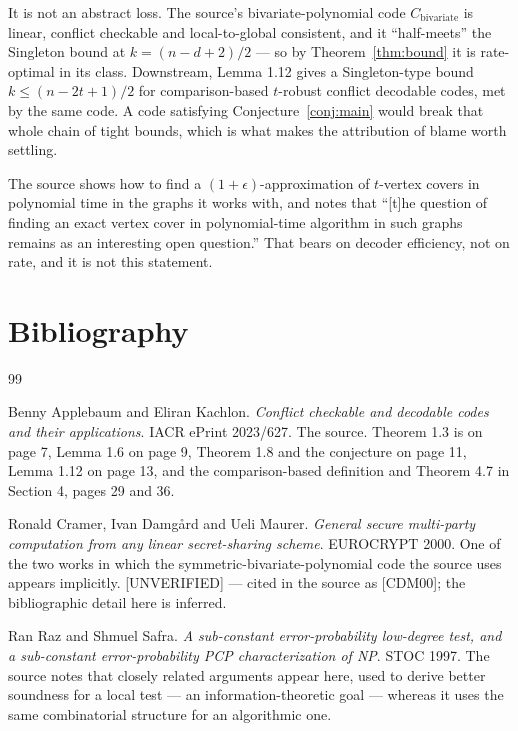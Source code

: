 \documentclass{conjura-conjecture}
\begin{document}
\begin{remark}\label{rem:cost}
It is not an abstract loss. The source's bivariate-polynomial code
$C_{\mathrm{bivariate}}$ is linear, conflict checkable and local-to-global
consistent, and it ``half-meets'' the Singleton bound at $k =
(n-d+2)/2$ --- so by Theorem~\ref{thm:bound} it is rate-optimal in its
class. Downstream, Lemma 1.12 gives a Singleton-type bound $k \le
(n-2t+1)/2$ for comparison-based $t$-robust conflict decodable codes, met
by the same code. A code satisfying Conjecture~\ref{conj:main} would
break that whole chain of tight bounds, which is what makes the
attribution of blame worth settling.
\end{remark}

\begin{remark}\label{rem:neighbours}
The source shows how to find a $(1+\epsilon)$-approximation of
$t$-vertex covers in polynomial time in the graphs it works with, and
notes that ``[t]he question of finding an exact vertex cover in
polynomial-time algorithm in such graphs remains as an interesting open
question.'' That bears on decoder efficiency, not on rate, and it is not
this statement.
\end{remark}

\section{Bibliography}

\begin{conjurabibliography}{99}

Benny Applebaum and Eliran Kachlon.
\emph{Conflict checkable and decodable codes and their applications}.
IACR ePrint 2023/627.
The source. Theorem 1.3 is on page 7, Lemma 1.6 on page 9, Theorem 1.8
and the conjecture on page 11, Lemma 1.12 on page 13, and the
comparison-based definition and Theorem 4.7 in Section 4, pages 29 and
36.

Ronald Cramer, Ivan Damg\r{a}rd and Ueli Maurer.
\emph{General secure multi-party computation from any linear secret-sharing
scheme}.
EUROCRYPT 2000.
One of the two works in which the symmetric-bivariate-polynomial code the
source uses appears implicitly. [UNVERIFIED] --- cited in the source as
[CDM00]; the bibliographic detail here is inferred.

Ran Raz and Shmuel Safra.
\emph{A sub-constant error-probability low-degree test, and a
sub-constant error-probability PCP characterization of NP}.
STOC 1997.
The source notes that closely related arguments appear here, used to
derive better soundness for a local test --- an information-theoretic
goal --- whereas it uses the same combinatorial structure for an
algorithmic one.

\end{conjurabibliography}
\end{document}

